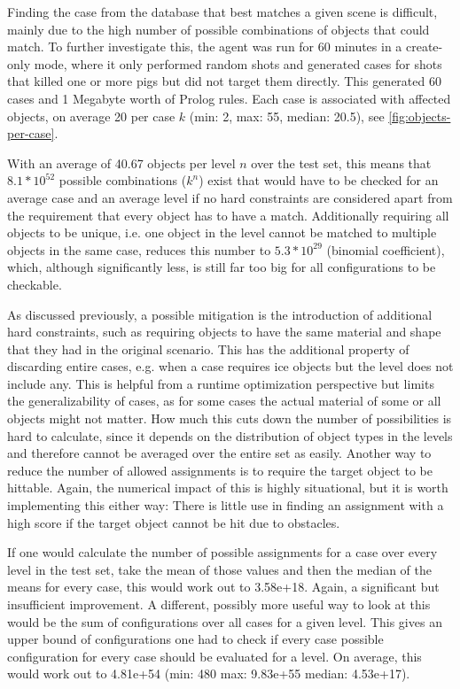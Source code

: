 Finding the case from the database that best matches a given scene is difficult, mainly due to the high number of possible combinations of objects that could match.
To further investigate this, the agent was run for 60 minutes in a create-only mode, where it only performed random shots and generated cases for shots that killed one or more pigs but did not target them directly.
This generated 60 cases and 1 Megabyte worth of Prolog rules. Each case is associated with affected objects, on average 20 per case $k$ (min: 2, max: 55, median: 20.5), see \ref{fig:objects-per-case}.

With an average of 40.67 objects per level $n$ over the test set, this means that
$8.1*10^52$ possible combinations ($k^n$) exist that would have to be checked for an average case and an average level if no hard constraints are considered apart from the requirement that every object has to have a match.
Additionally requiring all objects to be unique, i.e. one object in the level cannot be matched to multiple objects in the same case, reduces this number to
$5.3*10^29$ (binomial coefficient), which, although significantly less, is still far too big for all configurations to be checkable.


As discussed previously, a possible mitigation is the introduction of additional hard constraints, such as requiring objects to have the same material and shape that they had in the original scenario.
This has the additional property of discarding entire cases, e.g. when a case requires ice objects but the level does not include any.
This is helpful from a runtime optimization perspective but limits the generalizability of cases, as for some cases the actual material of some or all objects might not matter.
How much this cuts down the number of possibilities is hard to calculate, since it depends on the distribution of object types in the levels and therefore cannot be averaged over the entire set as easily.
Another way to reduce the number of allowed assignments is to require the target object to be hittable.
Again, the numerical impact of this is highly situational, but it is worth implementing this either way:
There is little use in finding an assignment with a high score if the target object cannot be hit due to obstacles.

If one would calculate the number of possible assignments for a case over every level in the test set, take the mean of those values and then the median of the means for every case, this would work out to 3.58e+18. Again, a significant but insufficient improvement.
A different, possibly more useful way to look at this would be the sum of configurations over all cases for a given level. This gives an upper bound of configurations one had to check if every case possible configuration for every case should be evaluated for a level. On average, this would work out to 4.81e+54 (min: 480 max: 9.83e+55 median: 4.53e+17).

